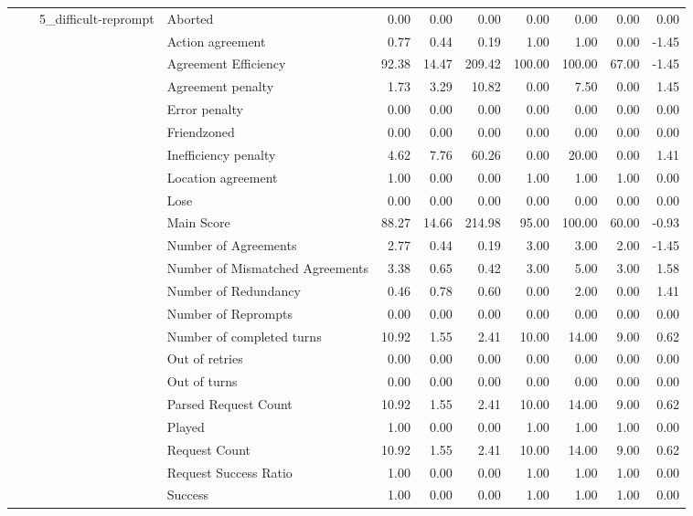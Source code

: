 \begin{tabular}{llllrrrrrrr}
\cline{3-11}
 &  & \multirow[t]{27}{*}{5_difficult-reprompt} & Aborted & 0.00 & 0.00 & 0.00 & 0.00 & 0.00 & 0.00 & 0.00 \\
 &  &  & Action agreement & 0.77 & 0.44 & 0.19 & 1.00 & 1.00 & 0.00 & -1.45 \\
 &  &  & Agreement Efficiency & 92.38 & 14.47 & 209.42 & 100.00 & 100.00 & 67.00 & -1.45 \\
 &  &  & Agreement penalty & 1.73 & 3.29 & 10.82 & 0.00 & 7.50 & 0.00 & 1.45 \\
 &  &  & Error penalty & 0.00 & 0.00 & 0.00 & 0.00 & 0.00 & 0.00 & 0.00 \\
 &  &  & Friendzoned & 0.00 & 0.00 & 0.00 & 0.00 & 0.00 & 0.00 & 0.00 \\
 &  &  & Inefficiency penalty & 4.62 & 7.76 & 60.26 & 0.00 & 20.00 & 0.00 & 1.41 \\
 &  &  & Location agreement & 1.00 & 0.00 & 0.00 & 1.00 & 1.00 & 1.00 & 0.00 \\
 &  &  & Lose & 0.00 & 0.00 & 0.00 & 0.00 & 0.00 & 0.00 & 0.00 \\
 &  &  & Main Score & 88.27 & 14.66 & 214.98 & 95.00 & 100.00 & 60.00 & -0.93 \\
 &  &  & Number of Agreements & 2.77 & 0.44 & 0.19 & 3.00 & 3.00 & 2.00 & -1.45 \\
 &  &  & Number of Mismatched Agreements & 3.38 & 0.65 & 0.42 & 3.00 & 5.00 & 3.00 & 1.58 \\
 &  &  & Number of Redundancy & 0.46 & 0.78 & 0.60 & 0.00 & 2.00 & 0.00 & 1.41 \\
 &  &  & Number of Reprompts & 0.00 & 0.00 & 0.00 & 0.00 & 0.00 & 0.00 & 0.00 \\
 &  &  & Number of completed turns & 10.92 & 1.55 & 2.41 & 10.00 & 14.00 & 9.00 & 0.62 \\
 &  &  & Out of retries & 0.00 & 0.00 & 0.00 & 0.00 & 0.00 & 0.00 & 0.00 \\
 &  &  & Out of turns & 0.00 & 0.00 & 0.00 & 0.00 & 0.00 & 0.00 & 0.00 \\
 &  &  & Parsed Request Count & 10.92 & 1.55 & 2.41 & 10.00 & 14.00 & 9.00 & 0.62 \\
 &  &  & Played & 1.00 & 0.00 & 0.00 & 1.00 & 1.00 & 1.00 & 0.00 \\
 &  &  & Request Count & 10.92 & 1.55 & 2.41 & 10.00 & 14.00 & 9.00 & 0.62 \\
 &  &  & Request Success Ratio & 1.00 & 0.00 & 0.00 & 1.00 & 1.00 & 1.00 & 0.00 \\
 &  &  & Success & 1.00 & 0.00 & 0.00 & 1.00 & 1.00 & 1.00 & 0.00 \\

\end{tabular}
